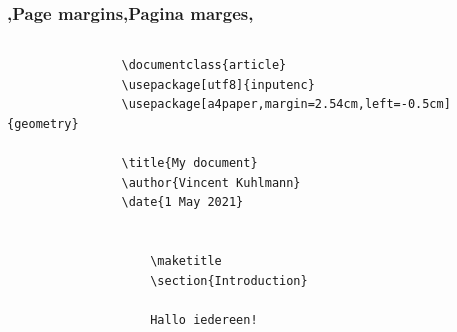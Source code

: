         
%         
            
%         

\begin{frame}[fragile]
    \frametitle{\lang,Page margins,Pagina marges,}
    \begin{columns}
        \begin{column}{0.67\textwidth}
            \begin{verbatim}
                \documentclass{article}
                \usepackage[utf8]{inputenc}
                \usepackage[a4paper,margin=2.54cm,left=-0.5cm]{geometry}
                
                \title{My document}
                \author{Vincent Kuhlmann}
                \date{1 May 2021}
                
                
                    \maketitle
                    \section{Introduction}
                    
                    Hallo iedereen!
                

\end{verbatim}
\end{column}
\end{columns}
\end{frame}
